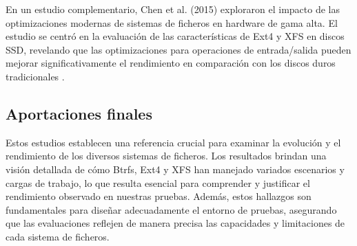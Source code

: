 En un estudio complementario, Chen et al. (2015) exploraron el impacto de las optimizaciones modernas de sistemas de ficheros en hardware de gama alta. El estudio se centró en la evaluación de las características de Ext4 y XFS en discos SSD, revelando que las optimizaciones para operaciones de entrada/salida pueden mejorar significativamente el rendimiento en comparación con los discos duros tradicionales \cite{chen2015optimization}.

\subsection{Aportaciones finales}

Estos estudios establecen una referencia crucial para examinar la evolución y el rendimiento de los diversos sistemas de ficheros. Los resultados brindan una visión detallada de cómo Btrfs, Ext4 y XFS han manejado variados escenarios y cargas de trabajo, lo que resulta esencial para comprender y justificar el rendimiento observado en nuestras pruebas. Además, estos hallazgos son fundamentales para diseñar adecuadamente el entorno de pruebas, asegurando que las evaluaciones reflejen de manera precisa las capacidades y limitaciones de cada sistema de ficheros.

